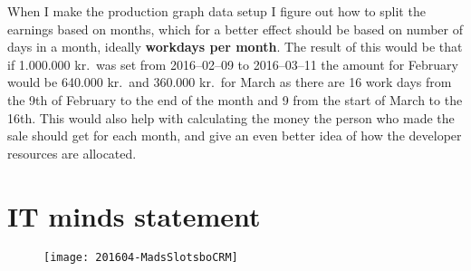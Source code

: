 When I make the production graph data setup I figure out how to split the
earnings based on months, which for a better effect should be based on number of
days in a month, ideally \textbf{workdays per month}. The result of this would be that if
1.000.000 kr.\ was set from 2016--02--09 to 2016--03--11 the amount for February
would be 640.000 kr.\ and 360.000 kr.\ for March as there are 16 work days from
the 9th of February to the end of the month and 9 from the start of March to the
16th. This would also help with calculating the money the person who made the
sale should get for each month, and give an even better idea of how the
developer resources are allocated.

\clearpage
\section{IT minds statement}
\begin{figure}[h!]
\texttt{[image: 201604-MadsSlotsboCRM]}
\end{figure}